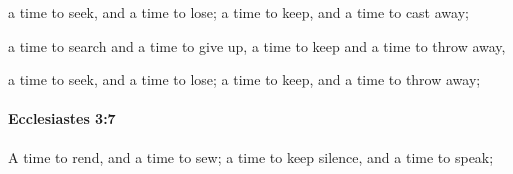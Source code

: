 			\begin{versebox}
					\item[BHS] 
					\item[LXX] 
					\item[ASV] a time to seek, and a time to lose; a time to keep, and a time to cast away;
					\item[NIV] a time to search and a time to give up, a time to keep and a time to throw away,
					\item[NRSV] a time to seek, and a time to lose; a time to keep, and a time to throw away;
			\end{versebox}

		\paragraph{Ecclesiastes 3:7} %
			\label{ECCLESIASTES-3-7}

			A time to rend, and a time to sew; a time to keep silence, and a time to speak;

